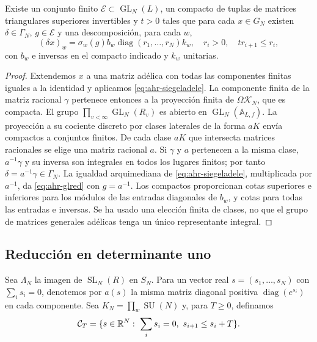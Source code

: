 \begin{proposicion}
\label{prop:ahr-glred}
Existe un conjunto finito $\mathcal E\subset\operatorname{GL}_N(L)$, un compacto de tuplas de matrices triangulares superiores invertibles y $t>0$ tales que para cada $x\in G_N$ existen $\delta\in\Gamma_N$, $g\in\mathcal E$ y una descomposición, para cada $w$,
\begin{equation}
 (\delta x)_w=\sigma_w(g)b_w\operatorname{diag}(r_1,\ldots,r_N)k_w,
 \quad r_i>0,\quad tr_{i+1}\le r_i,
 \label{eq:ahr-glred}
\end{equation}
con $b_w$ e inversas en el compacto indicado y $k_w$ unitarias.
\end{proposicion}
\begin{proof}
Extendemos $x$ a una matriz adélica con todas las componentes finitas iguales a la identidad y aplicamos \eqref{eq:ahr-siegeladele}. La componente finita de la matriz racional $\gamma$ pertenece entonces a la proyección finita de $\Omega\mathcal K_N$, que es compacta. El grupo $\prod_{v<\infty}\operatorname{GL}_N(R_v)$ es abierto en $\operatorname{GL}_N(\mathbb A_{L,f})$. La proyección a su cociente discreto por clases laterales de la forma $aK$ envía compactos a conjuntos finitos. De cada clase $aK$ que intersecta matrices racionales se elige una matriz racional $a$. Si $\gamma$ y $a$ pertenecen a la misma clase, $a^{-1}\gamma$ y su inversa son integrales en todos los lugares finitos; por tanto $\delta=a^{-1}\gamma\in\Gamma_N$. La igualdad arquimediana de \eqref{eq:ahr-siegeladele}, multiplicada por $a^{-1}$, da \eqref{eq:ahr-glred} con $g=a^{-1}$. Los compactos proporcionan cotas superiores e inferiores para los módulos de las entradas diagonales de $b_w$, y cotas para todas las entradas e inversas. Se ha usado una elección finita de clases, no que el grupo de matrices generales adélicas tenga un único representante integral.
\end{proof}

\subsection{Reducción en determinante uno}

Sea $\Lambda_N$ la imagen de $\operatorname{SL}_N(R)$ en $S_N$. Para un vector real $s=(s_1,\ldots,s_N)$ con $\sum_i s_i=0$, denotemos por $a(s)$ la misma matriz diagonal positiva $\operatorname{diag}(e^{s_i})$ en cada componente. Sea $K_N=\prod_w\operatorname{SU}(N)$ y, para $T\ge0$, definamos
\begin{equation}
 \mathcal C_T=\{s\in\mathbb{R}^N:\ \sum_i s_i=0,\ s_{i+1}\le s_i+T\}.
 \label{eq:ahr-cone}
\end{equation}

